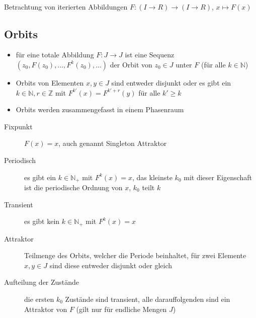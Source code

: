 \vspace*{-0.5\baselineskip}\\
Betrachtung von iterierten Abbildungen $F:(I\rightarrow R)\rightarrow(I\rightarrow R)$, $x\mapsto F(x)$\\
\vspace*{-0.5\baselineskip}
\subsection{Orbits}
	\begin{itemize}
		\item für eine totale Abbildung $F:J\rightarrow J$ ist eine Sequenz $(z_0,F(z_0),\dots,F^k(z_0),\dots)$ der Orbit von $z_0\in J$ unter $F$ (für alle $k\in \mathbb{N}$)
		\item Orbits von Elementen $x,y\in J$ sind entweder disjunkt oder es gibt ein $k\in\mathbb{N},r\in \mathbb{Z}$ mit $F^{k'}(x)=F^{k'+r}(y)$ für alle $k'\geq k$
		\item Orbits werden zusammengefasst in einem Phasenraum
	\end{itemize}
	\begin{description}
		\item[Fixpunkt] $F(x)=x$, auch genannt \glqq Singleton Attraktor\grqq
		\item[Periodisch] es gibt ein $k\in\mathbb{N}_+$ mit $F^k(x)=x$, das kleinste $k_0$ mit dieser Eigenschaft ist die periodische Ordnung von $x$, $k_0$ teilt $k$
		\item[Transient] es gibt kein $k\in\mathbb{N}_+$ mit $F^k(x)=x$
		\item[Attraktor] Teilmenge des Orbits, welcher die Periode beinhaltet, für zwei Elemente $x,y\in J$ sind diese entweder disjunkt oder gleich
		\item[Aufteilung der Zustände] die ersten $k_0$ Zustände sind transient, alle darauffolgenden sind ein Attraktor von $F$ (gilt nur für endliche Mengen $J$)
	\end{description}
\topbreak
\vspace*{-2\baselineskip}
